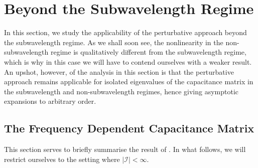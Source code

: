 \documentclass[a4paper,reqno,twoside]{amsart}
\numberwithin{equation}{section}
\theoremstyle{definition}
\newcommand{\<}{\ensuremath \leq}
\renewcommand{\>}{\ensuremath \geq}
\begin{document}
%
\section{Beyond the Subwavelength Regime}\label{sec:nonsubwavelength}
In this section, we study the applicability of the perturbative approach beyond the subwavelength regime. As we shall soon see, the nonlinearity in the non-subwavelength regime is qualitatively different from the subwavelength regime, which is why in this case we will have to contend ourselves with a weaker result. An upshot, however, of the analysis in this section is that the perturbative approach remains applicable for isolated eigenvalues of the capacitance matrix in the subwavelength and non-subwavelength regimes, hence giving asymptotic expansions to arbitrary order.



\subsection{The Frequency Dependent Capacitance Matrix}
This section serves to briefly summarise the result of \cite{ammari2026frequencydependentcapacitancematrixformulation}. In what follows, we will restrict ourselves to the setting where $\lvert \mathcal{I}\rvert <\infty$.
\end{document}
